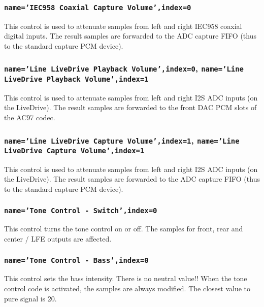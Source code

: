 \documentclass[a4paper,8pt,english]{sphinxmanual}
\begin{document}
\subsubsection{\texttt{name='IEC958 Coaxial Capture Volume',index=0}}
\label{sound/cards/sb-live-mixer:name-iec958-coaxial-capture-volume-index-0}
This control is used to attenuate samples from left and right IEC958 coaxial
digital inputs. The result samples are forwarded to the ADC capture FIFO
(thus to the standard capture PCM device).


\subsubsection{\texttt{name='Line LiveDrive Playback Volume',index=0}, \texttt{name='Line LiveDrive Playback Volume',index=1}}
\label{sound/cards/sb-live-mixer:name-line-livedrive-playback-volume-index-0-name-line-livedrive-playback-volume-index-1}
This control is used to attenuate samples from left and right I2S ADC
inputs (on the LiveDrive). The result samples are forwarded to the front
DAC PCM slots of the AC97 codec.


\subsubsection{\texttt{name='Line LiveDrive Capture Volume',index=1}, \texttt{name='Line LiveDrive Capture Volume',index=1}}
\label{sound/cards/sb-live-mixer:name-line-livedrive-capture-volume-index-1-name-line-livedrive-capture-volume-index-1}
This control is used to attenuate samples from left and right I2S ADC
inputs (on the LiveDrive). The result samples are forwarded to the ADC
capture FIFO (thus to the standard capture PCM device).


\subsubsection{\texttt{name='Tone Control - Switch',index=0}}
\label{sound/cards/sb-live-mixer:name-tone-control-switch-index-0}
This control turns the tone control on or off. The samples for front, rear
and center / LFE outputs are affected.


\subsubsection{\texttt{name='Tone Control - Bass',index=0}}
\label{sound/cards/sb-live-mixer:name-tone-control-bass-index-0}
This control sets the bass intensity. There is no neutral value!!
When the tone control code is activated, the samples are always modified.
The closest value to pure signal is 20.
\end{document}
